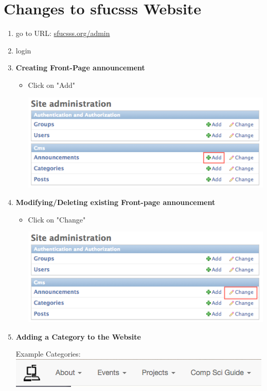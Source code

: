 \documentclass{article}
\begin{document}
\section*{Changes to sfucsss Website}

\begin{enumerate}
	\item go to URL: \url{sfucsss.org/admin}
	\item login
	\item \textbf{Creating Front-Page announcement}
	\begin{itemize}
		\item Click on "Add"
		
		\includegraphics[scale=0.45]{Announcements-picture1.png}
		
	\end{itemize}
	\item \textbf{Modifying/Deleting existing Front-page announcement}
	\begin{itemize}
		\item Click on "Change"
		
		\includegraphics[scale=0.45]{Announcements-picture2.png}
 
	\end{itemize}
	\item \textbf{Adding a Category to the Website}
	
	Example Categories: \includegraphics[scale=0.45]{Categories-picture1.png}
	

\end{enumerate}
\end{document}
